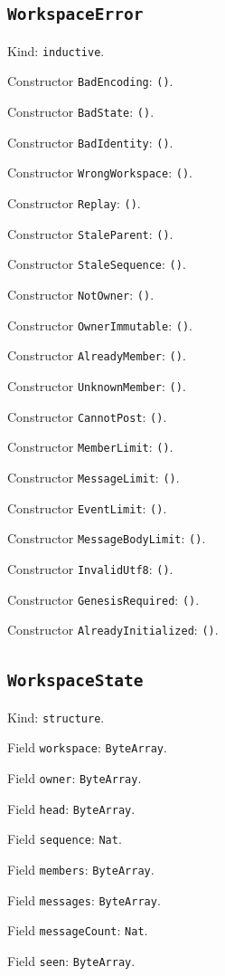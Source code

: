 \documentclass[11pt]{article}
\begin{document}
\subsection*{\texttt{WorkspaceError}}
\noindent Kind: \texttt{inductive}.\par
\noindent Constructor \texttt{BadEncoding}: \texttt{()}.\par
\noindent Constructor \texttt{BadState}: \texttt{()}.\par
\noindent Constructor \texttt{BadIdentity}: \texttt{()}.\par
\noindent Constructor \texttt{WrongWorkspace}: \texttt{()}.\par
\noindent Constructor \texttt{Replay}: \texttt{()}.\par
\noindent Constructor \texttt{StaleParent}: \texttt{()}.\par
\noindent Constructor \texttt{StaleSequence}: \texttt{()}.\par
\noindent Constructor \texttt{NotOwner}: \texttt{()}.\par
\noindent Constructor \texttt{OwnerImmutable}: \texttt{()}.\par
\noindent Constructor \texttt{AlreadyMember}: \texttt{()}.\par
\noindent Constructor \texttt{UnknownMember}: \texttt{()}.\par
\noindent Constructor \texttt{CannotPost}: \texttt{()}.\par
\noindent Constructor \texttt{MemberLimit}: \texttt{()}.\par
\noindent Constructor \texttt{MessageLimit}: \texttt{()}.\par
\noindent Constructor \texttt{EventLimit}: \texttt{()}.\par
\noindent Constructor \texttt{MessageBodyLimit}: \texttt{()}.\par
\noindent Constructor \texttt{InvalidUtf8}: \texttt{()}.\par
\noindent Constructor \texttt{GenesisRequired}: \texttt{()}.\par
\noindent Constructor \texttt{AlreadyInitialized}: \texttt{()}.\par
\subsection*{\texttt{WorkspaceState}}
\noindent Kind: \texttt{structure}.\par
\noindent Field \texttt{workspace}: \texttt{ByteArray}.\par
\noindent Field \texttt{owner}: \texttt{ByteArray}.\par
\noindent Field \texttt{head}: \texttt{ByteArray}.\par
\noindent Field \texttt{sequence}: \texttt{Nat}.\par
\noindent Field \texttt{members}: \texttt{ByteArray}.\par
\noindent Field \texttt{messages}: \texttt{ByteArray}.\par
\noindent Field \texttt{messageCount}: \texttt{Nat}.\par
\noindent Field \texttt{seen}: \texttt{ByteArray}.\par
\end{document}
